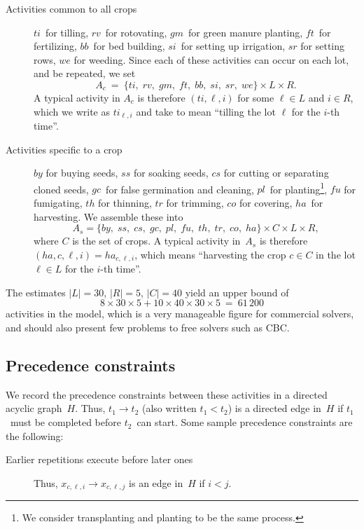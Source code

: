 \documentclass[11pt]{amsart}
\newcommand{\lra}{\longrightarrow}
\numberwithin{equation}{section}
\begin{document}
\begin{description}
\item[Activities common to all crops]  $ti$~for tilling, $rv$~for
  rotovating, $gm$~for green manure planting, $f\!t$~for fertilizing,
  $bb$~for bed building, $si$~for setting up irrigation, $sr$ for
  setting rows, $we$ for weeding. Since each of these activities can
  occur on each lot, and be repeated, we set
  \[
     A_c 
     \ = \
     \{ ti,\;rv,\;gm,\;f\!t,\;bb,\;si,\;sr,\;we\} \times L \times R.
  \]
  A typical activity in $A_c$ is therefore $(ti,\ell, i)$ for some
  $\ell\in L$ and $i\in R$, which we write as $ti_{\ell, i}$ and take
  to mean ``tilling the lot $\ell$ for the $i$-th time''.

\smallskip
\item[Activities specific to a crop] $by$ for buying seeds, $ss$ for
  soaking seeds, $cs$ for cutting or separating cloned seeds, $gc$~for
  false germination and cleaning, $pl$~for planting\footnote{We
    consider transplanting and planting to be the same process.},
  $f\!u$ for fumigating, $th$ for thinning, $tr$ for trimming, $co$
  for covering, $ha$~for harvesting. We assemble these into
  \[
     A_s = \{ by,\;ss,\;cs,\;gc,\;pl,\;f\!u,\;th,\;tr,\;co,\;ha\}
     \times C \times L \times R,
  \]
  where $C$ is the set of crops. A typical activity in~$A_s$ is therefore
  $(ha,c,\ell, i)=ha_{c,\ell, i}$, which means ``harvesting the crop $c\in
  C$ in the lot $\ell\in L$ for the $i$-th time''.
\end{description}

The estimates $|L|=30$, $|R|=5$, $|C|=40$ yield an upper bound of
\[
    8 \times 30 \times 5 + 10 \times 40 \times 30 \times 5
    \ = \
    61\,200
\]
activities in the model, which is a very manageable figure for
commercial solvers, and should also present few problems to free
solvers such as CBC.


\subsection{Precedence constraints}

We record the precedence constraints between these activities in a directed acyclic
graph~$H$. Thus, $t_1\lra t_2$ (also written $t_1<t_2$) is a directed edge
in~$H$ if $t_1$~must be completed before $t_2$~can start. Some sample precedence
constraints are the following:

\begin{description}
\item[Earlier repetitions execute before later ones] Thus, $x_{c,\ell,i}\lra
  x_{c,\ell,j}$ is an edge in~$H$ if $i<j$.
\end{description}
\end{document}
